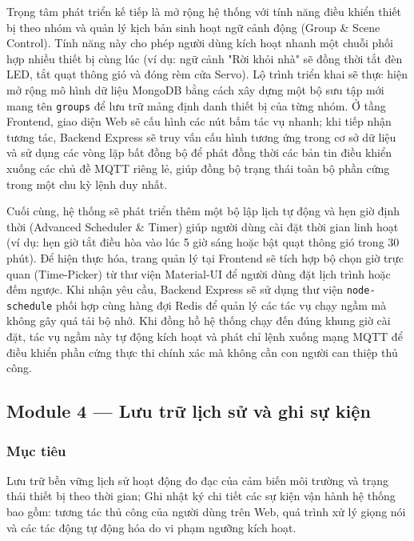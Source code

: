 Trọng tâm phát triển kế tiếp là mở rộng hệ thống với tính năng điều khiển thiết bị theo nhóm và quản lý kịch bản sinh hoạt ngữ cảnh động (Group \& Scene Control). Tính năng này cho phép người dùng kích hoạt nhanh một chuỗi phối hợp nhiều thiết bị cùng lúc (ví dụ: ngữ cảnh "Rời khỏi nhà" sẽ đồng thời tắt đèn LED, tắt quạt thông gió và đóng rèm cửa Servo). Lộ trình triển khai sẽ thực hiện mở rộng mô hình dữ liệu MongoDB bằng cách xây dựng một bộ sưu tập mới mang tên \texttt{groups} để lưu trữ mảng định danh thiết bị của từng nhóm. Ở tầng Frontend, giao diện Web sẽ cấu hình các nút bấm tác vụ nhanh; khi tiếp nhận tương tác, Backend Express sẽ truy vấn cấu hình tương ứng trong cơ sở dữ liệu và sử dụng các vòng lặp bất đồng bộ để phát đồng thời các bản tin điều khiển xuống các chủ đề MQTT riêng lẻ, giúp đồng bộ trạng thái toàn bộ phần cứng trong một chu kỳ lệnh duy nhất.

Cuối cùng, hệ thống sẽ phát triển thêm một bộ lập lịch tự động và hẹn giờ định thời (Advanced Scheduler \& Timer) giúp người dùng cài đặt thời gian linh hoạt (ví dụ: hẹn giờ tắt điều hòa vào lúc 5 giờ sáng hoặc bật quạt thông gió trong 30 phút). Để hiện thực hóa, trang quản lý tại Frontend sẽ tích hợp bộ chọn giờ trực quan (Time-Picker) từ thư viện Material-UI để người dùng đặt lịch trình hoặc đếm ngược. Khi nhận yêu cầu, Backend Express sẽ sử dụng thư viện \texttt{node-schedule} phối hợp cùng hàng đợi Redis để quản lý các tác vụ chạy ngầm mà không gây quá tải bộ nhớ. Khi đồng hồ hệ thống chạy đến đúng khung giờ cài đặt, tác vụ ngầm này tự động kích hoạt và phát chỉ lệnh xuống mạng MQTT để điều khiển phần cứng thực thi chính xác mà không cần con người can thiệp thủ công.

\subsection{Module 4 --- Lưu trữ lịch sử và ghi sự kiện}

\subsubsection{Mục tiêu}
Lưu trữ bền vững lịch sử hoạt động đo đạc của cảm biến môi trường và trạng thái thiết bị theo thời gian; Ghi nhật ký chi tiết các sự kiện vận hành hệ thống bao gồm: tương tác thủ công của người dùng trên Web, quá trình xử lý giọng nói và các tác động tự động hóa do vi phạm ngưỡng kích hoạt.

